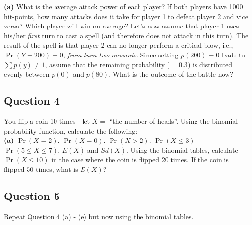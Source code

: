 \documentclass[]{article}
\begin{document}
{\bf(a)} What is the average attack power of each player?  If both players have 1000 hit-points, how many attacks does it take for player 1 to defeat player 2 and vice versa? Which player will win on average?  Let's now assume that player 1 uses his/her \emph{first} turn to cast a spell (and therefore does not attack in this turn). The result of the spell is that player 2 can no longer perform a critical blow, i.e., $\Pr(Y=200) = 0$, \emph{from turn two onwards}. Since setting $p(200) = 0$ leads to $\sum p(y) \ne 1$, assume that the remaining probability ($= 0.3$) is distributed evenly between $p(0)$ and $p(80)$. What is the outcome of the battle now?


\subsection*{Question 4}

You flip a coin 10 times - let $X =$ ``the number of heads''. Using the binomial probability function, calculate the following:\\[-0.2cm]

{\bf(a)} $\Pr(X = 2)$.  $\Pr(X = 0)$.   $\Pr(X > 2)$.  $\Pr(X \le 3)$.  $\Pr(5 \le X \le 7)$.   $E(X)$ and $Sd(X)$.  Using the binomial tables, calculate $\Pr(X \le10)$ in the case where the coin is flipped 20 times.  If the coin is flipped 50 times, what is $E(X)$?

\subsection*{Question 5}

Repeat Question 4 (a) - (e) but now using the binomial tables.
\end{document}
